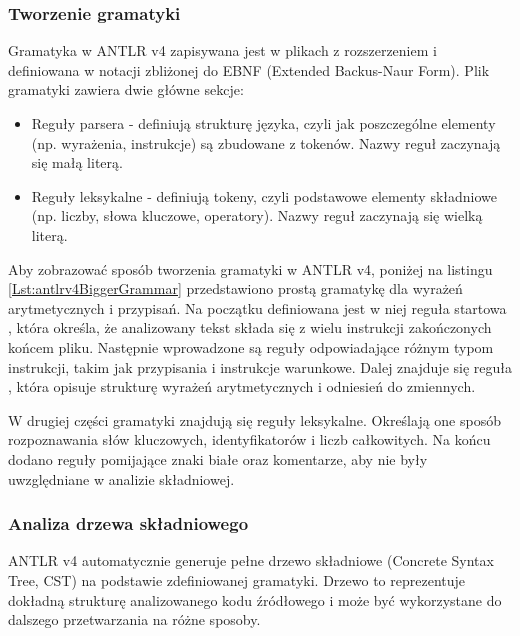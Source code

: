 \documentclass[12pt,twoside]{article}
\begin{document}
\subsubsection{Tworzenie gramatyki}
Gramatyka w ANTLR v4 zapisywana jest w plikach z rozszerzeniem  i definiowana w notacji zbliżonej do EBNF (Extended Backus-Naur Form). Plik gramatyki zawiera dwie główne sekcje:
\begin{itemize}[label=\textbullet, leftmargin=1.25cm]
   \item Reguły parsera - definiują strukturę języka, czyli jak poszczególne elementy (np. wyrażenia, instrukcje) są zbudowane z tokenów. Nazwy reguł zaczynają się małą literą.
   \item Reguły leksykalne - definiują tokeny, czyli podstawowe elementy składniowe (np. liczby, słowa kluczowe, operatory). Nazwy reguł zaczynają się wielką literą.
\end{itemize}
Aby zobrazować sposób tworzenia gramatyki w ANTLR v4, poniżej na listingu  \ref{Lst:antlrv4BiggerGrammar}  przedstawiono prostą gramatykę dla wyrażeń arytmetycznych i przypisań. Na początku definiowana jest w niej reguła startowa , która określa, że analizowany tekst składa się z wielu instrukcji zakończonych końcem pliku. Następnie wprowadzone są reguły odpowiadające różnym typom instrukcji, takim jak przypisania i instrukcje warunkowe. Dalej znajduje się reguła , która opisuje strukturę wyrażeń arytmetycznych i odniesień do zmiennych.

W drugiej części gramatyki znajdują się reguły leksykalne. Określają one sposób rozpoznawania słów kluczowych, identyfikatorów i liczb całkowitych. Na końcu dodano reguły pomijające znaki białe oraz komentarze, aby nie były uwzględniane w analizie składniowej.



\subsubsection{Analiza drzewa składniowego}
ANTLR v4 automatycznie generuje pełne drzewo składniowe (Concrete Syntax Tree, CST) na podstawie zdefiniowanej gramatyki. Drzewo to reprezentuje dokładną strukturę analizowanego kodu źródłowego i może być wykorzystane do dalszego przetwarzania na różne sposoby.
\end{document}
